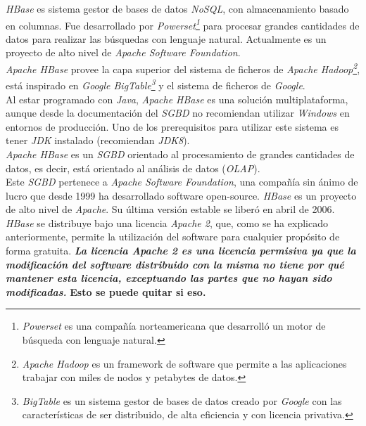 \documentclass{article}
\begin{document}
\emph{HBase} es sistema gestor de bases de datos \emph{NoSQL}, con almacenamiento basado en columnas. Fue desarrollado por \emph{Powerset\footnote{\emph{Powerset} es una compañía norteamericana que desarrolló un motor de búsqueda con lenguaje natural.\cite{WIKI:7}}} para procesar grandes cantidades de datos para realizar las búsquedas con lenguaje natural. Actualmente es un proyecto de alto nivel de \emph{Apache Software Foundation}. \cite{WIKI:8}\\
\emph{Apache HBase} provee la capa superior del sistema de ficheros de \emph{Apache Hadoop\footnote{\emph{Apache Hadoop} es un framework de software que permite a las aplicaciones trabajar con miles de nodos y petabytes de datos.\cite{WIKI:9}}}, está inspirado en \emph{Google BigTable\footnote{\emph{BigTable} es un sistema gestor de bases de datos creado por \emph{Google} con las características de ser distribuido, de alta eficiencia y con licencia privativa.\cite{WIKI:10}}} y el sistema de ficheros de \emph{Google}.\\

Al estar programado con \emph{Java}, \emph{Apache HBase} es una solución multiplataforma, aunque desde la documentación del \emph{SGBD} no recomiendan utilizar \emph{Windows} en entornos de producción. Uno de los prerequisitos para utilizar este sistema es tener \emph{JDK} instalado (recomiendan \emph{JDK8}). \cite{AP:6}\\

\emph{Apache HBase} es un \emph{SGBD} orientado al procesamiento de grandes cantidades de datos, es decir, está orientado al análisis de datos (\emph{OLAP}).\\

Este \emph{SGBD} pertenece a \emph{Apache Software Foundation}, una compañía sin ánimo de lucro que desde 1999 ha desarrollado software open-source. \emph{HBase} es un proyecto de alto nivel de \emph{Apache}. Su última versión estable se liberó en abril de 2006. \cite{WIKI:8} \\

\emph{HBase} se distribuye bajo una licencia \emph{Apache 2}, que, como se ha explicado anteriormente, permite la utilización del software para cualquier propósito de forma gratuita. \textbf{\textit{La licencia \emph{Apache 2} es una licencia permisiva ya que la modificación del software distribuido con la misma no tiene por qué mantener esta licencia, exceptuando las partes que no hayan sido modificadas.}} \textbf{{\Large Esto se puede quitar si eso}.} \cite{WIKI:6}\\
\end{document}
